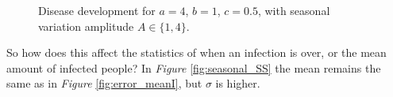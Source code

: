 \begin{figure}[H]
    \centering
    \caption{Disease development for $a=4$, $b=1$, $c=0.5$, with seasonal variation amplitude $A \in \{1,4\}$.}
    \label{fig:seasonalb1}
\end{figure}

So how does this affect the statistics of when an infection is over, or the mean amount of infected people? 
In \textit{Figure} \ref{fig:seasonal_SS} the mean remains the same as in \textit{Figure} \ref{fig:error_meanI}, but $\sigma$ is higher.

